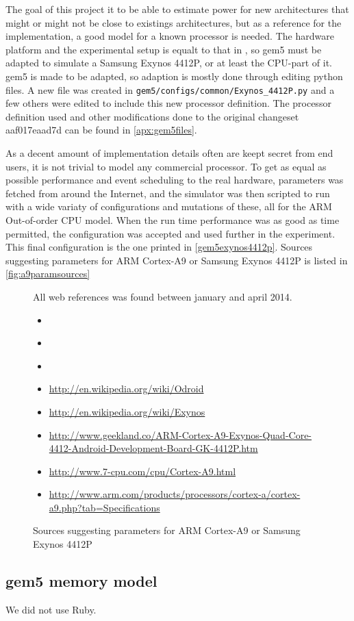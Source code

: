 The goal of this project it to be able to estimate power for new architectures
that might or might not be close to existings architectures, but as a reference
for the implementation, a good model for a known processor is needed. The
hardware platform and the experimental setup is equalt to that in
\cite{rundehvatum2013exploring}, so gem5 must be adapted to simulate a Samsung
Exynos 4412P, or at least the CPU-part of it.  gem5 is made to be adapted, so
adaption is mostly done through editing python files. A new file was created in
\texttt{gem5/configs/common/Exynos\_4412P.py} and a few others were edited to
include this new processor definition. The processor definition used and other
modifications done to the original changeset aaf017eaad7d can be found in
\autoref{apx:gem5files}.

As a decent amount of implementation details often are keept secret from end users, it
is not trivial to model any commercial processor. To get as equal as possible performance
and event scheduling to the real hardware, parameters was fetched from around the Internet,
and the simulator was then scripted to run with a wide variaty of configurations and
mutations of these, all for the ARM Out-of-order CPU model. When the run time performance was
as good as time permitted, the configuration was accepted and used further in the experiment.
This final configuration is the one printed in \autoref{gem5exynos4412p}. Sources suggesting
parameters for ARM Cortex-A9 or Samsung Exynos 4412P is listed in \autoref{fig:a9paramsources}

\begin{figure}
All web references was found between january and april 2014.
\begin{itemize}
    \item{\cite{blem2013detailed}}
    \item{\cite{butko2012accuracy}}
    \item{\cite{armtech}}
    \item{\url{http://en.wikipedia.org/wiki/Odroid}}
    \item{\url{http://en.wikipedia.org/wiki/Exynos}}
    \item{\url{http://www.geekland.co/ARM-Cortex-A9-Exynos-Quad-Core-4412-Android-Development-Board-GK-4412P.htm}}
    \item{\url{http://www.7-cpu.com/cpu/Cortex-A9.html}}
    \item{\url{http://www.arm.com/products/processors/cortex-a/cortex-a9.php?tab=Specifications}}
\end{itemize}
\caption{Sources suggesting parameters for ARM Cortex-A9 or Samsung Exynos 4412P}
\label{fig:a9paramsources}
\end{figure}


\subsection{gem5 memory model}
We did not use Ruby.
